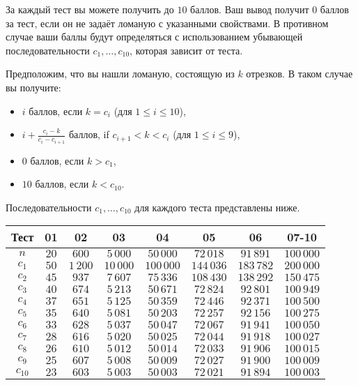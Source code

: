 За каждый тест вы можете получить до $10$ баллов. Ваш вывод получит $0$ баллов за
тест, если он не задаёт ломаную с указанными свойствами. В противном случае
ваши баллы будут определяться с использованием убывающей
последовательности $c_1, \ldots, c_{10}$, которая зависит от теста.

Предположим, что вы нашли ломаную, состоящую из $k$ отрезков. В таком случае
вы получите:

\begin{itemize}
\item $i$ баллов, если $k = c_i$ (для $1 \leq i \leq 10$),
\item $i + \frac{c_i - k}{c_i - c_{i+1}}$  баллов, if $c_{i+1} < k < c_i$ (для $1 \leq i \leq 9$),
\item $0$ баллов, если $k > c_1$,
\item $10$ баллов, если $k < c_{10}$.
\end{itemize}

Последовательности $c_1, \ldots, c_{10}$ для каждого теста представлены ниже.

\begin{center}
\renewcommand{\arraystretch}{1.5}
\begin{tabular}{|c|c|c|c|c|c|c|c|}
\hline
Тест & 01 & 02 & 03 & 04 & 05 & 06 & 07-10 \\
\hline
$n$ & $20$ & $600$ & $5\,000$ & $50\,000$ & $72\,018$ & $91\,891$ & $100\,000$ \\
\hline
$c_{1}$ & $50$ & $1\,200$ & $10\,000$ & $100\,000$ & $144\,036$ & $183\,782$ & $200\,000$ \\
\hline
$c_{2}$&$45$&$937$&$7\,607$&$75\,336$&$108\,430$&$138\,292$&$150\,475$ \\
\hline
$c_{3}$&$40$&$674$&$5\,213$&$50\,671$&$72\,824$&$92\,801$&$100\,949$ \\
\hline
$c_{4}$&$37$&$651$&$5\,125$&$50\,359$&$72\,446$&$92\,371$&$100\,500$ \\
\hline
$c_{5}$&$35$&$640$&$5\,081$&$50\,203$&$72\,257$&$92\,156$&$100\,275$ \\
\hline
$c_{6}$&$33$&$628$&$5\,037$&$50\,047$&$72\,067$&$91\,941$&$100\,050$ \\
\hline
$c_{7}$&$28$&$616$&$5\,020$&$50\,025$&$72\,044$&$91\,918$&$100\,027$ \\ 
\hline
$c_{8}$&$26$&$610$&$5\,012$&$50\,014$&$72\,033$&$91\,906$&$100\,015$ \\
\hline
$c_{9}$&$25$&$607$&$5\,008$&$50\,009$&$72\,027$&$91\,900$&$100\,009$ \\
\hline 
$c_{10}$&$23$&$603$&$5\,003$&$50\,003$&$72\,021$&$91\,894$&$100\,003$ \\
\hline
\end{tabular}
\end{center}